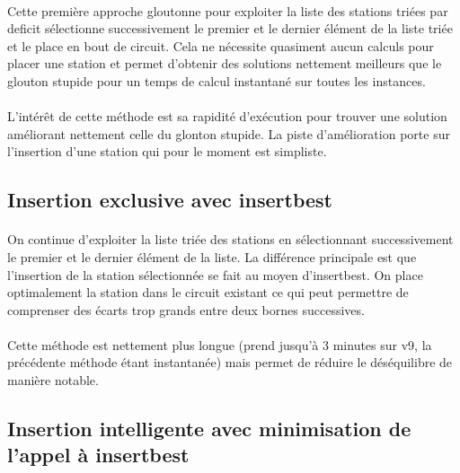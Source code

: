 \documentclass[a4paper, 11pt]{article} %
\begin{document}
\paragraph*{}
Cette première approche gloutonne pour exploiter la liste des stations triées par deficit sélectionne successivement le premier et le dernier élément de la liste triée et le place en bout de circuit. Cela ne nécessite quasiment aucun calculs pour placer une station et permet d'obtenir des solutions nettement meilleurs que le glouton stupide pour un temps de calcul instantané sur toutes les instances.

\paragraph*{}
L'intérêt de cette méthode est sa rapidité d'exécution pour trouver une solution améliorant nettement celle du glonton stupide. La piste d'amélioration porte sur l'insertion d'une station qui pour le moment est simpliste.

\subsection{Insertion exclusive avec insertbest}

\paragraph*{}
On continue d'exploiter la liste triée des stations en sélectionnant successivement le premier et le dernier élément de la liste. La différence principale est que l'insertion de la station sélectionnée se fait au moyen d'insertbest. On place optimalement la station dans le circuit existant ce qui peut permettre de comprenser des écarts trop grands entre deux bornes successives.

\paragraph*{}
Cette méthode est nettement plus longue (prend jusqu'à 3 minutes sur v9, la précédente méthode étant instantanée) mais permet de réduire le déséquilibre de manière notable.

\subsection{Insertion intelligente avec minimisation de l'appel à insertbest}
\end{document}
